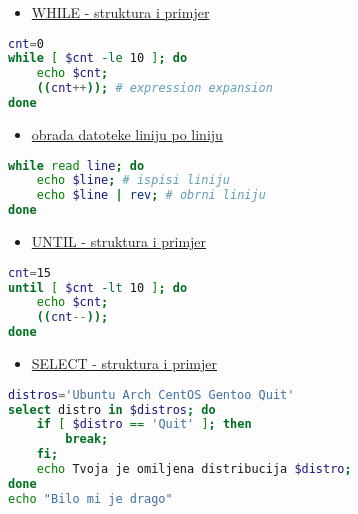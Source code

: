 \documentclass{beamer}
\begin{document}
\begin{frame}[fragile]
	\begin{itemize}
		\item \underline{WHILE - struktura i primjer}
	\end{itemize}
	\begin{lstlisting}[language=bash]
cnt=0
while [ $cnt -le 10 ]; do
	echo $cnt;
	((cnt++)); # expression expansion
done
	\end{lstlisting}

	\begin{itemize}
		\item \underline{obrada datoteke liniju po liniju}
	\end{itemize}
	\begin{lstlisting}[language=bash]
while read line; do
	echo $line; # ispisi liniju
	echo $line | rev; # obrni liniju
done
	\end{lstlisting}
\end{frame}


\begin{frame}[fragile]
	\begin{itemize}
		\item \underline{UNTIL - struktura i primjer}
	\end{itemize}
	\begin{lstlisting}[language=bash]
cnt=15
until [ $cnt -lt 10 ]; do
	echo $cnt;
	((cnt--));
done
	\end{lstlisting}

	\begin{itemize}
		\item \underline{SELECT - struktura i primjer}
	\end{itemize}
	\begin{lstlisting}[language=bash]
distros='Ubuntu Arch CentOS Gentoo Quit'
select distro in $distros; do
	if [ $distro == 'Quit' ]; then
		break;
	fi;
	echo Tvoja je omiljena distribucija $distro;
done
echo "Bilo mi je drago"
	\end{lstlisting}
\end{frame}
\end{document}
